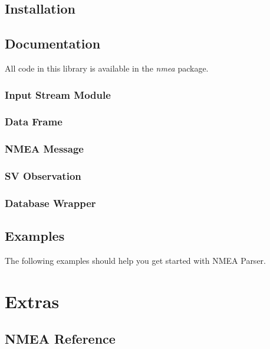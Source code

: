 \documentclass{report} %
\newcommand{\projname}{NMEA Parser}
\begin{document}
\section{Installation}


\section{Documentation}

All code in this library is available in the \emph{nmea} package.

\subsection{Input Stream Module}


\newpage	%
\subsection{Data Frame}


\newpage
\subsection{NMEA Message}


\newpage
\subsection{SV Observation}


\subsection{Database Wrapper}


\section{Examples}

The following examples should help you get started with \projname.


\chapter{Extras}

\section{NMEA Reference}

\end{document}
